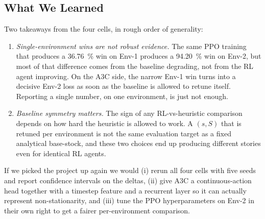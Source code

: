 \documentclass[letterpaper]{article} %
\begin{document}
\subsection{What We Learned}
Two takeaways from the four cells, in rough order of generality:
\begin{enumerate}
\item \emph{Single-environment wins are not robust evidence.}
      The same PPO training that produces a \SI{36.76}{\percent}
      win on Env-1 produces a \SI{94.20}{\percent} win on Env-2,
      but most of that difference comes from the baseline
      degrading, not from the RL agent improving.  On the A3C
      side, the narrow Env-1 win turns into a decisive Env-2
      loss as soon as the baseline is allowed to retune itself.
      Reporting a single number, on one environment, is just not
      enough.
\item \emph{Baseline symmetry matters.}  The sign of any
      RL-vs-heuristic comparison depends on how hard the
      heuristic is allowed to work.  A $(s,S)$ that is retuned
      per environment is not the same evaluation target as a
      fixed analytical base-stock, and these two choices end up
      producing different stories even for identical RL agents.
\end{enumerate}
If we picked the project up again we would (i) rerun all four
cells with five seeds and report confidence intervals on the
deltas, (ii) give A3C a continuous-action head together with a
timestep feature and a recurrent layer so it can actually
represent non-stationarity, and (iii) tune the PPO
hyperparameters on Env-2 in their own right to get a fairer
per-environment comparison.

\end{document}
